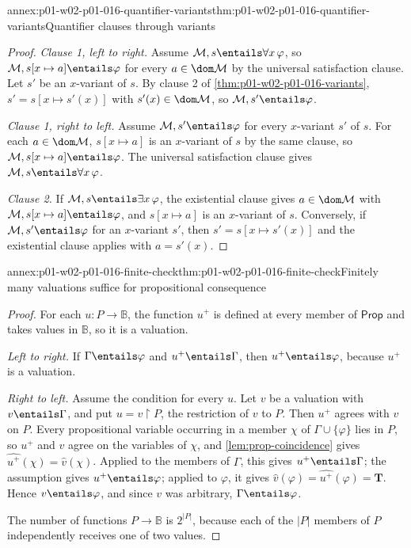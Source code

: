 \begin{annexitem}{annex:p01-w02-p01-016-quantifier-variants}{thm:p01-w02-p01-016-quantifier-variants}{Quantifier clauses through variants}
\begin{proof}
\emph{Clause 1, left to right.} Assume
\(\mathcal M,s\entails\forall x\,\varphi\), so
\(\mathcal M,s[x\mapsto a]\entails\varphi\) for every \(a\in\dom\mathcal M\)
by the universal satisfaction clause. Let \(s'\) be an \(x\)-variant of
\(s\). By clause 2 of \cref{thm:p01-w02-p01-016-variants},
\(s'=s[x\mapsto s'(x)]\) with \(s'(x)\in\dom\mathcal M\), so
\(\mathcal M,s'\entails\varphi\).

\emph{Clause 1, right to left.} Assume \(\mathcal M,s'\entails\varphi\) for
every \(x\)-variant \(s'\) of \(s\). For each \(a\in\dom\mathcal M\),
\(s[x\mapsto a]\) is an \(x\)-variant of \(s\) by the same clause, so
\(\mathcal M,s[x\mapsto a]\entails\varphi\). The universal satisfaction
clause gives \(\mathcal M,s\entails\forall x\,\varphi\).

\emph{Clause 2.} If \(\mathcal M,s\entails\exists x\,\varphi\), the
existential clause gives \(a\in\dom\mathcal M\) with
\(\mathcal M,s[x\mapsto a]\entails\varphi\), and \(s[x\mapsto a]\) is an
\(x\)-variant of \(s\). Conversely, if \(\mathcal M,s'\entails\varphi\) for an
\(x\)-variant \(s'\), then \(s'=s[x\mapsto s'(x)]\) and the existential clause
applies with \(a=s'(x)\).
\end{proof}
\end{annexitem}

\begin{annexitem}{annex:p01-w02-p01-016-finite-check}{thm:p01-w02-p01-016-finite-check}{Finitely many valuations suffice for propositional consequence}
\begin{proof}
For each \(u\colon P\to\mathbb B\), the function \(u^{+}\) is defined at every
member of \(\mathsf{Prop}\) and takes values in \(\mathbb B\), so it is a
valuation.

\emph{Left to right.} If \(\Gamma\entails\varphi\) and \(u^{+}\entails\Gamma\),
then \(u^{+}\entails\varphi\), because \(u^{+}\) is a valuation.

\emph{Right to left.} Assume the condition for every \(u\). Let \(v\) be a
valuation with \(v\entails\Gamma\), and put \(u=v\mathbin{\upharpoonright}P\),
the restriction of \(v\) to \(P\). Then \(u^{+}\) agrees with \(v\) on \(P\).
Every propositional variable occurring in a member \(\chi\) of
\(\Gamma\cup\{\varphi\}\) lies in \(P\), so \(u^{+}\) and \(v\) agree on the
variables of \(\chi\), and \cref{lem:prop-coincidence} gives
\(\widehat{u^{+}}(\chi)=\widehat v(\chi)\). Applied to the members of
\(\Gamma\), this gives \(u^{+}\entails\Gamma\); the assumption gives
\(u^{+}\entails\varphi\); applied to \(\varphi\), it gives
\(\widehat v(\varphi)=\widehat{u^{+}}(\varphi)=\mathbf T\). Hence
\(v\entails\varphi\), and since \(v\) was arbitrary,
\(\Gamma\entails\varphi\).

The number of functions \(P\to\mathbb B\) is \(2^{\lvert P\rvert}\), because
each of the \(\lvert P\rvert\) members of \(P\) independently receives one of
two values.
\end{proof}
\end{annexitem}

